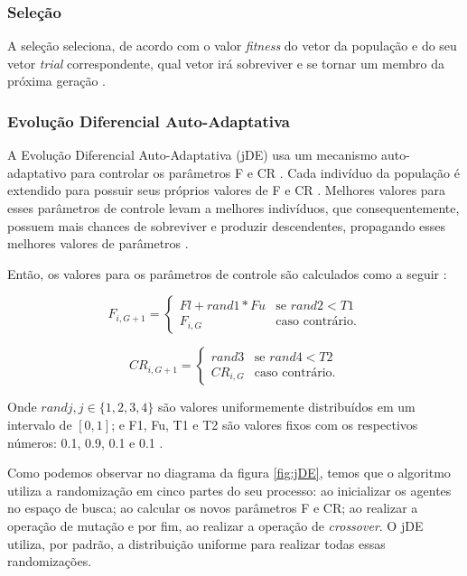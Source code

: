 \subsubsection{Seleção}

A seleção seleciona, de acordo com o valor \textit{fitness} do vetor da população e do seu vetor \textit{trial} correspondente, qual vetor irá sobreviver e se tornar um membro da próxima geração \cite{brest}.

\subsubsection{Evolução Diferencial Auto-Adaptativa}

A Evolução Diferencial Auto-Adaptativa (jDE) usa um mecanismo auto-adaptativo para controlar os parâmetros F e CR \cite{brest}. Cada indivíduo da população é extendido para possuir seus próprios valores de F e CR \cite{brest}. Melhores valores para esses parâmetros de controle levam a melhores indivíduos, que consequentemente, possuem mais chances de sobreviver e produzir descendentes, propagando esses melhores valores de parâmetros \cite{brest}.

Então, os valores para os parâmetros de controle são calculados como a seguir \cite{brest}:

\begin{equation}
F_{i,G+1} = 
\begin{cases}
	Fl + rand1 * Fu    & \text{se $rand2 < T1$}\\
    F_{i,G} & \text{caso contrário.}
\end{cases}
\end{equation}

\begin{equation}
CR_{i,G+1} = 
\begin{cases}
	rand3    & \text{se $rand4 < T2$}\\
    CR_{i,G} & \text{caso contrário.}
\end{cases}
\end{equation}

Onde $randj, j \in \{1, 2, 3, 4\}$ são valores uniformemente distribuídos em um intervalo de $[0, 1]$; e F1, Fu, T1 e T2 são valores fixos com os respectivos números: 0.1, 0.9, 0.1 e 0.1 \cite{brest}.

Como podemos observar no diagrama da figura \ref{fig:jDE}, temos que o algoritmo utiliza a randomização em cinco partes do seu processo: ao inicializar os agentes no espaço de busca; ao calcular os novos parâmetros F e CR; ao realizar a operação de mutação e por fim, ao realizar a operação de \textit{crossover}. O jDE utiliza, por padrão, a distribuição uniforme para realizar todas essas randomizações.


